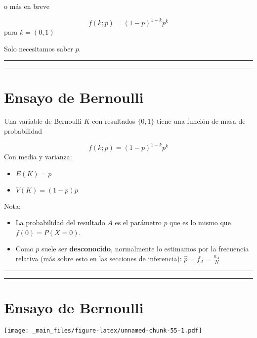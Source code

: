 \documentclass[
]{book}
\begin{document}
o más en breve

\[f(k; p)=(1-p)^{1-k} p^k\]
para \(k=(0,1)\)

Solo necesitamos saber \(p\).

\begin{center}\rule{0.5\linewidth}{0.5pt}\end{center}

\begin{center}\rule{0.5\linewidth}{0.5pt}\end{center}

\hypertarget{ensayo-de-bernoulli-2}{%
\section{Ensayo de Bernoulli}\label{ensayo-de-bernoulli-2}}

Una variable de Bernoulli \(K\) con resultados \(\{0, 1\}\) tiene una función de masa de probabilidad

\[f(k; p)=(1-p)^{1-k} p^k\]
Con media y varianza:

\begin{itemize}
\item
  \(E(K)=p\)
\item
  \(V(K)=(1-p)p\)
\end{itemize}

Nota:

\begin{itemize}
\item
  La probabilidad del resultado \(A\) es el parámetro \(p\)
  que es lo mismo que \(f(0)=P(X=0)\).
\item
  Como \(p\) suele ser \textbf{desconocido}, normalmente lo estimamos por la frecuencia relativa (más sobre esto en las secciones de inferencia): \(\hat{p}=f_A=\frac{n_A}{N}\)
\end{itemize}

\begin{center}\rule{0.5\linewidth}{0.5pt}\end{center}

\begin{center}\rule{0.5\linewidth}{0.5pt}\end{center}

\hypertarget{ensayo-de-bernoulli-3}{%
\section{Ensayo de Bernoulli}\label{ensayo-de-bernoulli-3}}

\texttt{[image: \_main\_files/figure-latex/unnamed-chunk-55-1.pdf]}
\end{document}
